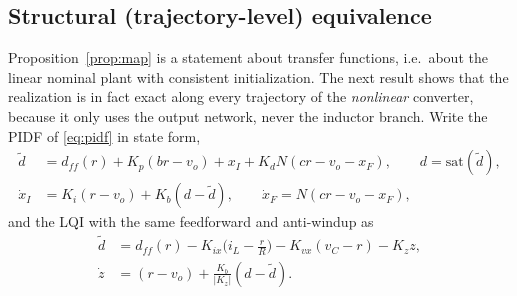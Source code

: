 \subsection{Structural (trajectory-level) equivalence}
Proposition~\ref{prop:map} is a statement about transfer functions, i.e.\ about
the linear nominal plant with consistent initialization. The next result shows
that the realization is in fact exact along every trajectory of the
\emph{nonlinear} converter, because it only uses the output network, never the
inductor branch. Write the PIDF of \eqref{eq:pidf} in state form,
\begin{equation}
\begin{aligned}
\tilde d&=d_{ff}(r)+K_p(br-v_o)+x_I+K_dN(cr-v_o-x_F),\qquad d=\mathrm{sat}(\tilde d),\\
\dot x_I&=K_i(r-v_o)+K_b(d-\tilde d),\qquad \dot x_F=N(cr-v_o-x_F),
\end{aligned}
\label{eq:pidfss}
\end{equation}
and the LQI with the same feedforward and anti-windup as
\begin{equation}
\begin{aligned}
\tilde d&=d_{ff}(r)-K_{ix}\big(i_L-\tfrac{r}{R}\big)-K_{vx}(v_C-r)-K_zz,\\
\dot z&=(r-v_o)+\tfrac{K_b}{|K_z|}(d-\tilde d).
\end{aligned}
\label{eq:lqiss}
\end{equation}

